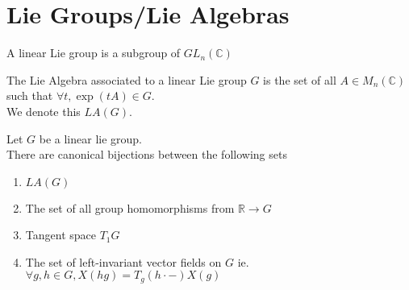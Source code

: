 \documentclass[../main.tex]{subfiles}
\begin{document}
\section{Lie Groups/Lie Algebras}
\begin{defn}
	A linear Lie group is a subgroup of $GL_n( \mathbb{C}) $ 
\end{defn}
\begin{defn}
	The Lie Algebra associated to a linear Lie group $G$ is the set of all $A\in M_n( \mathbb{C}) $ such that $\forall t, \exp( tA) \in G$.\\
	We denote this $LA( G) $.
\end{defn}
\begin{thm}
	Let $G$ be a linear lie group.\\
	There are canonical bijections between the following sets
	\begin{enumerate}
	\item $LA( G) $ 
	\item The set of all group homomorphisms from $ \mathbb{R}\to G$ 
	\item Tangent space $ T_{1} G$ 
	\item The set of left-invariant vector fields on $G$ ie. $\forall g,h \in G, X( hg) = T_g( h\cdot -) X( g) $ 
	\end{enumerate}
	
\end{thm}
\end{document}

